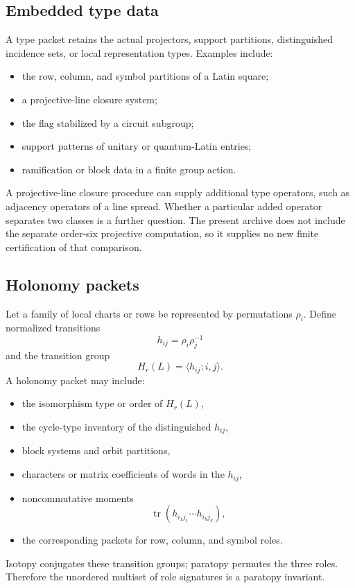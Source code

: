 \subsection{Embedded type data}
A type packet retains the actual projectors, support partitions, distinguished incidence sets, or local representation types.  Examples include:
\begin{itemize}
\item the row, column, and symbol partitions of a Latin square;
\item a projective-line closure system;
\item the flag stabilized by a circuit subgroup;
\item support patterns of unitary or quantum-Latin entries;
\item ramification or block data in a finite group action.
\end{itemize}

A projective-line closure procedure can supply additional type operators, such as adjacency operators of a line spread.  Whether a particular added operator separates two classes is a further question.  The present archive does not include the separate order-six projective computation, so it supplies no new finite certification of that comparison.

\subsection{Holonomy packets}
Let a family of local charts or rows be represented by permutations $\rho_i$.  Define normalized transitions
\[
h_{ij}=\rho_i\rho_j^{-1}
\]
and the transition group
\[
H_r(L)=\langle h_{ij}:i,j\rangle.
\]
A holonomy packet may include:
\begin{itemize}
\item the isomorphism type or order of $H_r(L)$,
\item the cycle-type inventory of the distinguished $h_{ij}$,
\item block systems and orbit partitions,
\item characters or matrix coefficients of words in the $h_{ij}$,
\item noncommutative moments
\[
\operatorname{tr}(h_{i_1j_1}\cdots h_{i_kj_k}),
\]
\item the corresponding packets for row, column, and symbol roles.
\end{itemize}

Isotopy conjugates these transition groups; paratopy permutes the three roles.  Therefore the unordered multiset of role signatures is a paratopy invariant.

